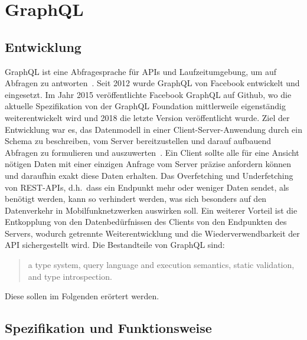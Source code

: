 \chapter{GraphQL}

\section{Entwicklung}
GraphQL ist eine Abfragesprache für APIs und Laufzeitumgebung, um auf Abfragen zu antworten~\cite{GraphQL-org}.
Seit 2012 wurde GraphQL von Facebook entwickelt und eingesetzt.
Im Jahr 2015 veröffentlichte Facebook GraphQL auf Github, wo die aktuelle Spezifikation von der GraphQL Foundation mittlerweile eigenständig weiterentwickelt wird und 2018 die letzte Version veröffentlicht wurde.
Ziel der Entwicklung war es, das Datenmodell in einer Client-Server-Anwendung durch ein Schema zu beschreiben, vom Server bereitzustellen und darauf aufbauend Abfragen zu formulieren und auszuwerten~\cite[vgl.][]{GraphQL-Spec}.
Ein Client sollte alle für eine Ansicht nötigen Daten mit einer einzigen Anfrage vom Server präzise anfordern können und daraufhin exakt diese Daten erhalten.
Das Overfetching und Underfetching von REST-APIs, d.h.\ dass ein Endpunkt mehr oder weniger Daten sendet, als benötigt werden, kann so verhindert werden, was sich besonders auf den Datenverkehr in Mobilfunknetzwerken auswirken soll.
Ein weiterer Vorteil ist die Entkopplung von den Datenbedürfnissen des Clients von den Endpunkten des Servers, wodurch getrennte Weiterentwicklung und die Wiederverwendbarkeit der API sichergestellt wird.
Die Bestandteile von GraphQL sind: \blockcquote{GraphQL-spec-github}{a type system, query language and execution semantics, static validation, and type introspection.}
Diese sollen im Folgenden erörtert werden.

\section{Spezifikation und Funktionsweise}

